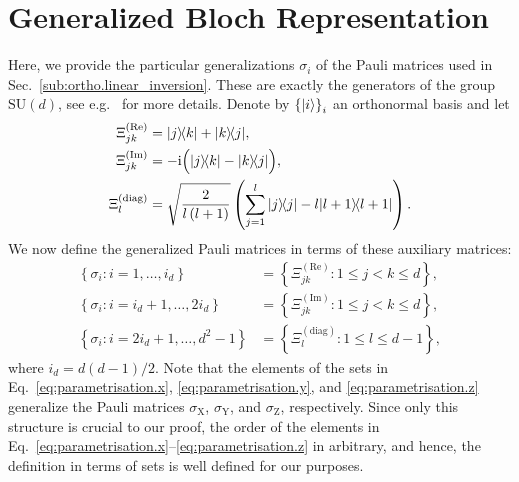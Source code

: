 
\section{Generalized Bloch Representation}
\label{sec:error.parametrisation}

Here, we provide the particular generalizations $\sigma_{i}$ of the Pauli matrices used in Sec.~\ref{sub:ortho.linear_inversion}.
These are exactly the generators of the group $\mathrm{SU}(d)$, see e.g.~\cite{Kimura_2003_Bloch,Byrd_2003_Characterization} for more details.
Denote by  ${\{\ket{i}\}}_i$ an orthonormal basis and let
\begin{align*}
  \Xi_{jk}^{(\textrm{Re})} &=  \ket{j}\bra{k} + \ket{k}\bra{j}, \\
  \Xi_{jk}^{(\textrm{Im})} &= -\ii \Big(\ket{j}\bra{k} - \ket{k}\bra{j}\Big), \\
  \Xi_{l}^{(\textrm{diag})} &= \sqrt{\frac{2}{l\left(l+1\right)}}\left(\sum_{j=1}^{l} \ket{j}\bra{j} - l \ket{l+1}\bra{l+1} \right).
\end{align*}
We now define the generalized Pauli matrices in terms of these auxiliary matrices:
\begin{align}
  \label{eq:parametrisation.x}
  \left\{ \sigma_{i}:i=1,\ldots,i_{d}\right\} &= \left\{ \Xi_{jk}^{(\textrm{Re})}:1\leq j<k\leq d\right\},  \\
  \label{eq:parametrisation.y}
  \left\{ \sigma_{i}:i=i_{d}+1,\ldots,2i_{d}\right\} &= \left\{ \Xi_{jk}^{(\textrm{Im})}:1\leq j<k\leq d\right\}, \\
  \label{eq:parametrisation.z}
  \left\{ \sigma_{i}:i=2i_{d}+1,\ldots,d^{2}-1\right\} &= \left\{ \Xi_{l}^{(\textrm{diag})}:1\leq l\leq d-1\right\},
\end{align}
where $i_{d}=d(d-1)/2$.
Note that the elements of the sets in Eq.~\eqref{eq:parametrisation.x}, \eqref{eq:parametrisation.y}, and \eqref{eq:parametrisation.z} generalize the Pauli matrices $\sigma_\mathrm{X}$, $\sigma_\mathrm{Y}$, and $\sigma_\mathrm{Z}$, respectively.
Since only this structure is crucial to our proof, the order of the elements in Eq.~\eqref{eq:parametrisation.x}--\eqref{eq:parametrisation.z} in arbitrary, and hence, the definition in terms of sets is well defined for our purposes.
